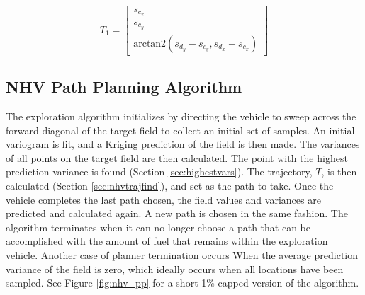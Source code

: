 \begin{equation}
	T_{1} = \begin{bmatrix}
		s_{c_x} \\
		s_{c_y} \\
		\text{arctan2}(s_{d_y} - s_{c_y}, s_{d_x} - s_{c_x})
	\end{bmatrix}
\end{equation}

\subsection{NHV Path Planning Algorithm} \label{sec:nvh_pp_alg}
The exploration algorithm initializes by directing the vehicle to sweep across the forward diagonal of the target field to collect an initial set of samples. An initial variogram is fit, and a Kriging prediction of the field is then made. The variances of all points on the target field are then calculated. The point with the highest prediction variance is found (Section \ref{sec:highestvars}). The trajectory, $T$, is then calculated (Section \ref{sec:nhvtrajfind}), and set as the path to take. Once the vehicle completes the last path chosen, the field values and variances are predicted and calculated again. A new path is chosen in the same fashion. The algorithm terminates when it can no longer choose a path that can be accomplished with the amount of fuel that remains within the exploration vehicle. Another case of planner termination occurs When the average prediction variance of the field is zero, which ideally occurs when all locations have been sampled. See Figure \ref{fig:nhv_pp} for a short 1\% capped version of the algorithm.

